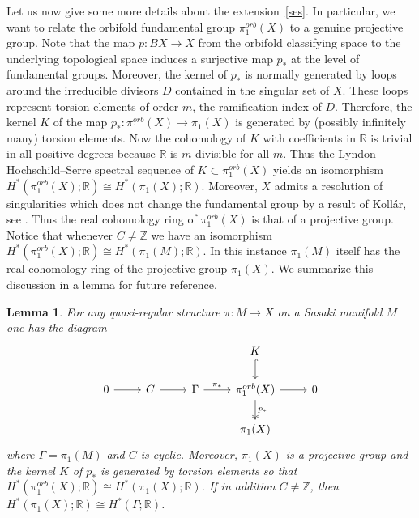\documentclass[12pt,leqno]{amsart}
\newcommand{\lra}{\longrightarrow}
\newcommand{\R}{\mathbb{R}}
\newcommand{\Z}{\mathbb{Z}}
\newtheorem{lem}[theor]{Lemma}
\begin{document}
Let us now give some more details about the extension~\eqref{ses}.
In particular, we want to relate the orbifold fundamental group $\pi_1^{orb}(X)$ to a genuine projective group. 
Note that the map $p\colon BX\lra X$ from the orbifold classifying space to the underlying topological space 
induces a surjective map $p_*$ at the level of fundamental groups. 
Moreover, the kernel of $p_*$ is normally generated by loops around the irreducible divisors $D$ contained in the singular set of $X$.
These loops represent torsion elements of order $m$, the ramification index of $D$.
Therefore, the kernel $K$ of the map $p_*\colon\pi_1^{orb}(X)\lra \pi_1(X)$ is generated by (possibly infinitely many) torsion elements.
Now the cohomology of $K$ with coefficients in $\R$ is trivial in all positive degrees because $\R$ is $m$-divisible for all $m$.
Thus the Lyndon--Hochschild--Serre spectral sequence of $K\subset \pi_1^{orb}(X)$ yields an isomorphism
$H^*(\pi_1^{orb}(X);\R)\cong H^*(\pi_1(X);\R)$.
Moreover, $X$ admits a resolution of singularities which does not change the fundamental group by a result of Koll\'ar, see \cite[Theorem~7.5.2]{kollar93}.
Thus the real cohomology ring of $\pi_1^{orb}(X)$ is that of a projective group.
Notice that whenever $C\neq\Z$ we have an isomorphism $H^*(\pi_1^{orb}(X);\R)\cong H^*(\pi_1(M);\R)$. In this instance $\pi_1(M)$ itself has the real cohomology ring of the projective group $\pi_1(X)$.
We summarize this discussion in a lemma for future reference.
\begin{lem}\label{LemCohomSasakiGroup}
	For any quasi-regular structure $\pi\colon M\lra X$ on a Sasaki manifold $M$ one has the diagram
	\begin{equation}\label{EqDiagramSasakiGroups}
		\begin{tikzcd}
			&             &                           & K \arrow[d, hook]&\\
			0 \arrow[r] & C \arrow[r] & \Gamma \arrow[r, "\pi_*"] & \pi_1^{orb}(X) \arrow[r] \arrow[d, two heads, "p_*"] & 0  \\
			&             &                           & \pi_1(X) &    
		\end{tikzcd} 
	\end{equation}
	where $\Gamma=\pi_1(M)$ and $C$ is cyclic.
	Moreover, $\pi_1(X)$ is a projective group and the kernel $K$ of $p_*$ is generated by torsion elements so that $H^*(\pi_1^{orb}(X);\R)\cong H^*(\pi_1(X);\R)$.
	If in addition $C\neq\Z$, then $H^*(\pi_1(X);\R)\cong H^*(\Gamma;\R)$.
\end{lem}
\end{document}
